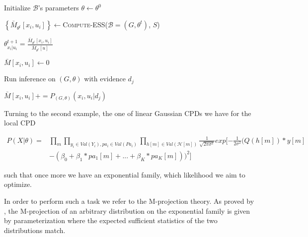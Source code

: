 \documentclass[11pt]{article}
\begin{document}
\begin{article}
\begin{algorithm*}[h!]
\begin{multicols}{2}
\begin{algorithmic}[1]
\State Initialize $\mathcal{B}$'s parameters $\theta \leftarrow \theta^0$

  \State $\left\{ \bar{M}_{\theta^t}[x_{i},u_{i}]\right\} \leftarrow$\textsc{Compute-ESS}($\mathcal{B}=(G,\theta^{t})$, $S$)



      \State $\theta_{x_{i}|u_{i}}^{t+1}=\frac{\bar{M}_{\theta^{t}}[x_{i},u_{i}]}{\bar{M}_{\theta^{t}}[u]}$
    \EndFor
  \EndFor
\EndFor
\EndProcedure
\\

   \State $\bar{M}[x_{i},u_{i}]\leftarrow 0$
  \EndFor
\EndFor

    \State Run inference on $(G,\theta)$ with evidence $d_{j}$
    
        \State $\bar{M}[x_{i},u_{i}] \mathrel{{+}{=}} P_{(G,\theta)}(x_{i},u_{i}|d_{j})$
      \EndFor
    \EndFor
\EndFor
\EndFunction
\end{algorithmic}
\end{multicols}
\end{algorithm*}


Turning to the second example, the one of linear Gaussian CPDs we
have for the local CPD

\begin{align} \label{eq:like-gaussian-cpd}
P(X|\theta) = &\prod_m \prod_{y_i \in Val(Y_i), pa_i \in Val(Pa_i)} \prod_{h[m] \in Val(\mathscr{H}[m])} \frac{1}{\sqrt{2\pi\sigma^2}} exp[-\frac{1}{2\sigma^2} (Q(h[m]) * y[m]  \\
            & - (\beta_0 + \beta_1 * pa_1[m] + ... + \beta_K * pa_K[m]))^2]  \nonumber
\end{align}

such that once more we have an exponential family, which likelihood
we aim to optimize.

In order to perform such a task we refer to the M-projection
theory. As proved by \cite{koller2009probabilistic}, the M-projection
of an arbitrary distribution on the exponential family is given by
parameterization where the expected sufficient statistics of the
two distributions match.


\end{article}
\end{document}

